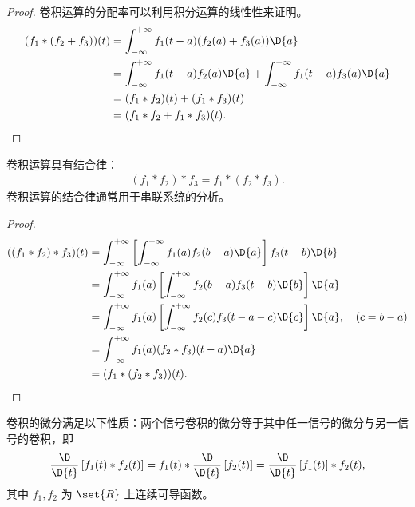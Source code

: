\begin{proof}
    卷积运算的分配率可以利用积分运算的线性性来证明。
    \begin{align*}
        (f_1 * (f_2 + f_3))(t) & = \int_{-\infty}^{+\infty}f_1(t - a)(f_2(a) + f_3(a))\D{a} \\
        & = \int_{-\infty}^{+\infty}f_1(t - a)f_2(a)\D{a} + \int_{-\infty}^{+\infty}f_1(t - a)f_3(a)\D{a} \\
        & = (f_1 * f_2)(t) + (f_1 * f_3)(t) \\
        & = (f_1 * f_2 + f_1 * f_3)(t).
    \end{align*}
\end{proof}

\begin{property}[卷积运算的结合律]
    卷积运算具有结合律：
    \begin{align*}
        (f_1 * f_2) * f_3 = f_1 * (f_2 * f_3).
    \end{align*}
    卷积运算的结合律通常用于串联系统的分析。
\end{property}

\begin{proof}
    \begin{align*}
        ((f_1 * f_2) * f_3)(t) & = \int_{-\infty}^{+\infty}\left[\int_{-\infty}^{+\infty}f_1(a) f_2(b - a)\D{a}\right]f_3(t - b)\D{b} \\
        & = \int_{-\infty}^{+\infty}f_1(a)\left[\int_{-\infty}^{+\infty}f_2(b - a)f_3(t - b)\D{b}\right]\D{a} \\
        & = \int_{-\infty}^{+\infty}f_1(a)\left[\int_{-\infty}^{+\infty}f_2(c)f_3(t - a - c)\D{c}\right]\D{a}, \quad (c = b - a) \\
        & = \int_{-\infty}^{+\infty}f_1(a)(f_2 * f_3)(t - a)\D{a} \\
        & = (f_1 * (f_2 * f_3))(t).
    \end{align*}
\end{proof}

\begin{property}[卷积的微分性质]
    \label{property:convolution-differential}
    卷积的微分满足以下性质：两个信号卷积的微分等于其中任一信号的微分与另一信号的卷积，即
    \begin{align*}
        \frac{\D}{\D{t}}\left[f_1(t) * f_2(t)\right]
        = f_1(t) * \frac{\D}{\D{t}}\left[f_2(t)\right]
        = \frac{\D}{\D{t}}\left[f_1(t)\right] * f_2(t),
    \end{align*}
    其中 $f_1, f_2$ 为  $\set{R}$ 上连续可导函数。
\end{property}

